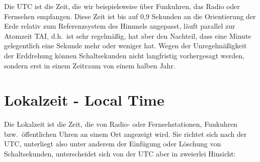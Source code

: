 Die UTC ist die Zeit, die wir beispielsweise \"uber Funkuhren, das Radio oder Fernsehen empfangen.
Diese Zeit ist bis auf 0,9 Sekunden an die Orientierung der Erde relativ zum Referenzsystem des Himmels
angepasst, l\"auft parallel zur Atomzeit TAI, d.h.\ ist sehr regelm\"a\ss ig, hat aber den Nachteil, 
dass eine Minute gelegentlich eine Sekunde mehr oder weniger hat. Wegen der Unregelm\"a\ss igkeit
der Erddrehung k\"onnen Schaltsekunden nicht langfristig vorhergesagt werden, sondern erst in einem
Zeitraum von einem halben Jahr. 

\section{Lokalzeit - Local Time}

Die Lokalzeit 
ist die Zeit, die von Radio- oder Fernsehstationen, Funkuhren bzw.\ \"offentlichen Uhren
an einem Ort angezeigt wird. Sie richtet sich nach der UTC, unterliegt also unter anderem der 
Einf\"ugung oder L\"oschung von Schaltsekunden, unterscheidet sich von der UTC aber in zweierlei
Hinsicht:
